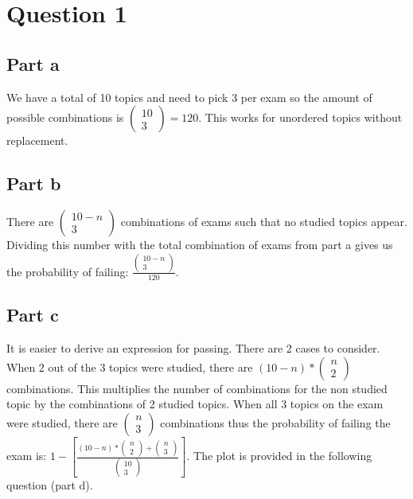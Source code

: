 \documentclass[10pt]{article}
\begin{document}
\section*{Question 1}
\subsection*{Part a}
We have a total of 10 topics and need to pick 3 per exam so the amount of possible combinations
is $\begin{pmatrix} 10 \\ 3 \end{pmatrix} = 120$. This works for unordered topics without replacement.


\subsection*{Part b}
There are $\begin{pmatrix} 10 - n \\ 3 \end{pmatrix}$ combinations of exams such that 
no studied topics appear. Dividing this number with the total combination of exams from 
part a gives us the probability of failing:
$\frac{\begin{pmatrix} 10 - n \\ 3 \end{pmatrix}}{120}$.


\subsection*{Part c}
It is easier to derive an expression for passing. There are 2 cases to consider. 
When 2 out of the 3 topics were studied, there are $(10 - n) * \begin{pmatrix} n \\ 2 \end{pmatrix}$
combinations. This multiplies the number of combinations for the non studied topic by the
combinations of 2 studied topics. When all 3 topics on the exam were studied, there are 
$\begin{pmatrix} n \\ 3 \end{pmatrix}$ combinations thus the probability of failing the exam is: $    1 - [ \frac{(10 - n) * \begin{pmatrix} n \\ 2 \end{pmatrix} + \begin{pmatrix} n \\ 3 \end{pmatrix}}{\begin{pmatrix} 10 \\ 3 \end{pmatrix}}]$.
The plot is provided in the following question (part d).
\end{document}
